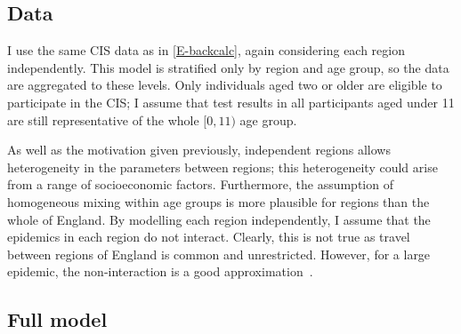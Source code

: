 \documentclass[thesis.tex]{subfiles}
\begin{document}
\subsection{Data}

I use the same CIS data as in \cref{E-backcalc}, again considering each region independently.
This model is stratified only by region and age group, so the data are aggregated to these levels.
Only individuals aged two or older are eligible to participate in the CIS; I assume that test results in all participants aged under 11 are still representative of the whole $[0, 11)$ age group.

As well as the motivation given previously, independent regions allows heterogeneity in the parameters between regions; this heterogeneity could arise from a range of socioeconomic factors.
Furthermore, the assumption of homogeneous mixing within age groups is more plausible for regions than the whole of England.
By modelling each region independently, I assume that the epidemics in each region do not interact.
Clearly, this is not true as travel between regions of England is common and unrestricted.
However, for a large epidemic, the non-interaction is a good approximation~\autocite{birrellRealtimea}.

\subsection{Full model} \label{SEIR:sec:full-model}
\end{document}
